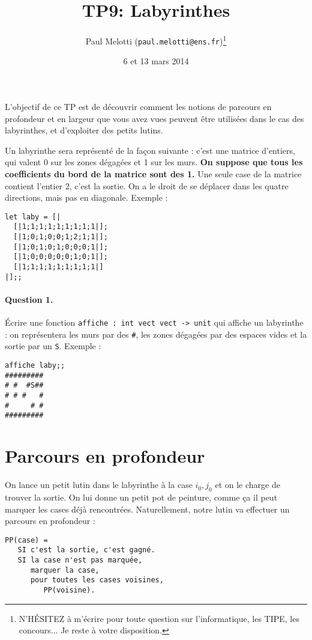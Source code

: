\documentclass[10pt,a4paper]{article}
\begin{document}
\title{TP9: Labyrinthes}
\author{Paul Melotti (\texttt{paul.melotti@ens.fr})\footnote{N'HÉSITEZ à
m'écrire pour toute question sur l'informatique, les TIPE, les concours... Je
reste à votre disposition.}}
\date{6 et 13 mars 2014}
\maketitle{}

L'objectif de ce TP est de découvrir comment les notions de parcours en
profondeur et en largeur que vous avez vues peuvent être utilisées dans le cas
des labyrinthes, et d'exploiter des petits lutins.

Un labyrinthe sera représenté de la façon suivante : c'est une matrice d'entiers,
qui valent 0 sur les zones dégagées et 1 sur les murs. \textbf{On suppose que tous
les coefficients du bord de la matrice sont des 1.} Une seule case de la matrice
contient l'entier 2, c'est la sortie. On a le droit de se déplacer dans les quatre
directions, mais pas en diagonale. Exemple :
\begin{verbatim}let laby = [|
  [|1;1;1;1;1;1;1;1;1|];
  [|1;0;1;0;0;1;2;1;1|];
  [|1;0;1;0;1;0;0;0;1|];
  [|1;0;0;0;0;0;1;0;1|];
  [|1;1;1;1;1;1;1;1;1|]
|];;\end{verbatim}
 
\paragraph{Question 1.} Écrire une fonction \texttt{affiche : int vect vect -> unit}
qui affiche un labyrinthe : on représentera les murs par des \texttt{\#}, les
zones dégagées par des espaces vides et la sortie par un \texttt{S}. Exemple :
\begin{verbatim}affiche laby;;
#########
# #  #S##
# # #   #
#     # #
#########\end{verbatim}

\section{Parcours en profondeur}
On lance un petit lutin dans le labyrinthe à la case $i_0,j_0$ et on le charge
de trouver la sortie. On lui donne un petit pot de peinture, comme ça il peut
marquer les cases déjà rencontrées. Naturellement, notre lutin va effectuer un
parcours en profondeur :
\begin{verbatim}PP(case) =
   SI c'est la sortie, c'est gagné.
   SI la case n'est pas marquée,
      marquer la case,
      pour toutes les cases voisines,
         PP(voisine).
\end{verbatim}
\end{document}
